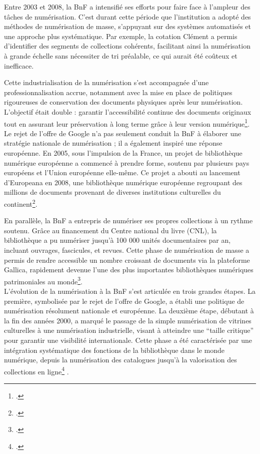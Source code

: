 \documentclass[a4paper,12pt,twoside]{book}
\begin{document}
	
	Entre 2003 et 2008, la BnF a intensifié ses efforts pour faire face à
	l’ampleur des tâches de numérisation. C’est durant cette période que
	l’institution a adopté des méthodes de numérisation de masse, s’appuyant sur
	des systèmes automatisés et une approche plus systématique. Par exemple, la
	cotation Clément a permis d’identifier des segments de collections cohérents,
	facilitant ainsi la numérisation à grande échelle sans nécessiter de tri préalable,
	ce qui aurait été coûteux et inefficace.
	
	Cette industrialisation de la numérisation s’est accompagnée d’une
	professionnalisation accrue, notamment avec la mise en place de politiques
	rigoureuses de conservation des documents physiques après leur
	numérisation. L’objectif était double : garantir l’accessibilité continue des
	documents originaux tout en assurant leur préservation à long terme grâce à
	leur version numérique\footcite{bermes_numerique_2020}.
	\\
	
	Le rejet de l’offre de Google n’a pas seulement conduit la BnF à élaborer une stratégie nationale de numérisation ; il a également inspiré une réponse européenne. En 2005, sous l’impulsion de la France, un projet de bibliothèque numérique européenne a commencé à prendre forme, soutenu par plusieurs pays européens et l’Union européenne elle-même. Ce projet a abouti au lancement d’Europeana en 2008, une bibliothèque numérique européenne regroupant des millions de documents provenant de diverses institutions culturelles du continent\footcite{bruckmann_numerisation_2012}.
	
	En parallèle, la BnF a entrepris de numériser ses propres collections à un rythme soutenu. Grâce au financement du Centre national du livre (CNL), la bibliothèque a pu numériser jusqu’à 100 000 unités documentaires par an, incluant ouvrages, fascicules, et revues. Cette phase de numérisation de masse a permis de rendre accessible un nombre croissant de documents via la plateforme Gallica, rapidement devenue l’une des plus importantes bibliothèques numériques patrimoniales au monde\footcite{bruckmann_numerisation_2012}.
	\\
	
	L’évolution de la numérisation à la BnF s’est articulée en trois grandes étapes. La première, symbolisée par le rejet de l’offre de Google, a établi une politique de numérisation résolument nationale et européenne. La deuxième étape, débutant à la fin des années 2000, a marqué le passage de la simple numérisation de vitrines culturelles à une numérisation industrielle, visant à atteindre une “taille critique” pour garantir une visibilité internationale. Cette phase a été caractérisée par une intégration systématique des fonctions de la bibliothèque dans le monde numérique, depuis la numérisation des catalogues jusqu’à la valorisation des collections en ligne\footcite{engel_numerique_2022} .
	
\end{document}
